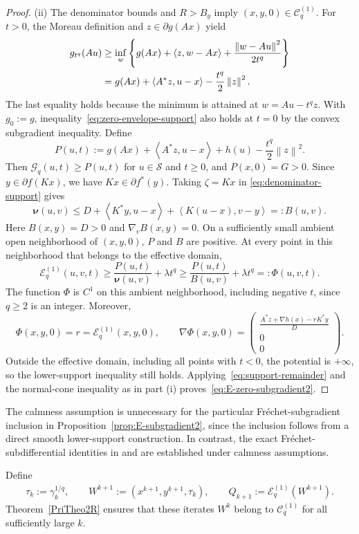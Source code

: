\documentclass[9pt]{article}
\numberwithin{equation}{section}
\theoremstyle{definition}
\theoremstyle{remark}
\newcommand{\Sset}{\mathcal S}
\newcommand{\norm}[1]{\left\lVert #1\right\rVert}
\newcommand{\ip}[2]{\left\langle #1,#2\right\rangle}
\newcommand{\Gcal}{\mathcal G}
\newcommand{\Ecal}{\mathcal E}
\newcommand{\Ccal}{\mathcal C}
\newcommand{\nuf}{\boldsymbol\nu}
\begin{document}
\begin{proof}
(ii) The denominator bounds and $R>B_y$ imply
$(x,y,0)\in\Ccal_q^{(1)}$. For $t>0$, the Moreau definition and
$z\in\partial g(Ax)$ yield
\begin{align}
 g_{t^q}(Au)
 &\geq\inf_w\left\{
 g(Ax)+\ip z{w-Ax}+\frac{\norm{w-Au}^2}{2t^q}\right\}\notag\\
 &=g(Ax)+\ip{A^*z}{u-x}-\frac{t^q}{2}\norm z^2.
 \label{eq:zero-envelope-support}
\end{align}
The last equality holds because the minimum is attained at $w=Au-t^qz$.
With $g_0:=g$, inequality~\eqref{eq:zero-envelope-support} also holds
at $t=0$ by the convex subgradient inequality.
Define
\[
 P(u,t):=g(Ax)+\ip{A^*z}{u-x}+h(u)-\frac{t^q}{2}\norm z^2.
\]
Then $\Gcal_q(u,t)\geq P(u,t)$ for $u\in\Sset$ and $t\geq0$,
and $P(x,0)=G>0$. Since $y\in\partial f(Kx)$, we have
$Kx\in\partial f^*(y)$. Taking $\zeta=Kx$ in
\eqref{eq:denominator-support} gives
\[
 \nuf(u,v)\leq
 D+\ip{K^*y}{u-x}+\ip{K(u-x)}{v-y}=:B(u,v).
\]
Here $B(x,y)=D>0$ and $\nabla_v B(x,y)=0$.
On a sufficiently small ambient open neighborhood of $(x,y,0)$,
$P$ and $B$ are positive. At every point in this neighborhood
that belongs to the effective domain,
\[
 \Ecal_q^{(1)}(u,v,t)
 \geq\frac{P(u,t)}{\nuf(u,v)}+\lambda t^q
 \geq\frac{P(u,t)}{B(u,v)}+\lambda t^q=:\Phi(u,v,t).
\]
The function $\Phi$ is $C^1$ on this ambient neighborhood, including
negative $t$, since $q\geq2$ is an integer. Moreover,
\[
 \Phi(x,y,0)=r=\Ecal_q^{(1)}(x,y,0),\qquad
 \nabla\Phi(x,y,0)=
 \begin{pmatrix}
 \displaystyle\frac{A^*z+\nabla h(x)-rK^*y}{D}\\[1.5ex]
 0\\[1.5ex]0
 \end{pmatrix}.
\]
Outside the effective domain, including all points with $t<0$,
the potential is $+\infty$, so the lower-support inequality still
holds. Applying~\eqref{eq:support-remainder} and the normal-cone
inequality as in part (i) proves~\eqref{eq:E-zero-subgradient2}.
\end{proof}

The calmness assumption is unnecessary for the particular
Fr\'echet-subgradient inclusion in
Proposition~\ref{prop:E-subgradient2}, since the inclusion follows
from a direct smooth lower-support construction. In contrast,
the exact Fr\'echet-subdifferential identities in
\cite[Proposition~2.3]{LiShenZhangZhou2022} and
\cite[Lemma~2]{HTX} are established under calmness assumptions.



\medskip
\medskip
Define
\begin{eqnarray}\label{eq:lifted-states}
\tau_k:=\gamma_k^{1/q},\qquad
 W^{k+1}:=(x^{k+1},y^{k+1},\tau_k),\qquad
 Q_{k+1}:=\Ecal_q^{(1)}(W^{k+1}).
\end{eqnarray}
Theorem~\ref{PriTheo2R} ensures that these iterates $W^{k}$  belong to
$\Ccal_q^{(1)}$ for all sufficiently large $k$.
\end{document}
